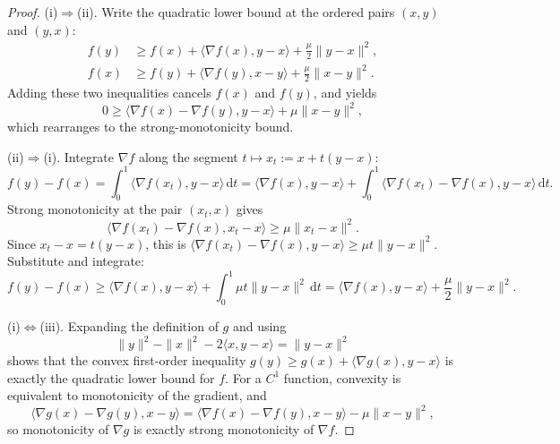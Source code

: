 \documentclass[11pt,a4paper]{article}
\theoremstyle{definition}
\begin{document}

\begin{proof}
\textup{(i)}$\Rightarrow$\textup{(ii)}.
Write the quadratic lower bound at the ordered pairs $(x,y)$ and $(y,x)$:
\begin{align*}
f(y)
&\geq f(x)+\langle\nabla f(x),y-x\rangle+\frac{\mu}{2}\|y-x\|^2,\\
f(x)
&\geq f(y)+\langle\nabla f(y),x-y\rangle+\frac{\mu}{2}\|x-y\|^2.
\end{align*}
Adding these two inequalities cancels $f(x)$ and $f(y)$, and yields
\[
0\geq\langle\nabla f(x)-\nabla f(y),y-x\rangle+\mu\|x-y\|^2,
\]
which rearranges to the strong-monotonicity bound.

\textup{(ii)}$\Rightarrow$\textup{(i)}.
Integrate $\nabla f$ along the segment $t\mapsto x_t:=x+t(y-x)$:
\[
f(y)-f(x)
=\int_0^1\langle\nabla f(x_t),y-x\rangle\,\mathrm{d}t
=\langle\nabla f(x),y-x\rangle
+\int_0^1\langle\nabla f(x_t)-\nabla f(x),y-x\rangle\,\mathrm{d}t.
\]
Strong monotonicity at the pair $(x_t,x)$ gives
\[
\langle\nabla f(x_t)-\nabla f(x),x_t-x\rangle
\geq\mu\|x_t-x\|^2.
\]
Since $x_t-x=t(y-x)$, this is $\langle\nabla f(x_t)-\nabla f(x),y-x\rangle\geq\mu t\|y-x\|^2$. Substitute and integrate:
\[
f(y)-f(x)
\geq\langle\nabla f(x),y-x\rangle
+\int_0^1\mu t\|y-x\|^2\,\mathrm{d}t
=\langle\nabla f(x),y-x\rangle+\frac{\mu}{2}\|y-x\|^2.
\]

\textup{(i)}$\Leftrightarrow$\textup{(iii)}.
Expanding the definition of $g$ and using
\[
\|y\|^2-\|x\|^2-2\langle x,y-x\rangle=\|y-x\|^2
\]
shows that the convex first-order inequality $g(y)\geq g(x)+\langle\nabla g(x),y-x\rangle$ is exactly the quadratic lower bound for $f$. For a $C^1$ function, convexity is equivalent to monotonicity of the gradient, and
\[
\langle\nabla g(x)-\nabla g(y),x-y\rangle
=\langle\nabla f(x)-\nabla f(y),x-y\rangle-\mu\|x-y\|^2,
\]
so monotonicity of $\nabla g$ is exactly strong monotonicity of $\nabla f$.
\end{proof}
\end{document}
